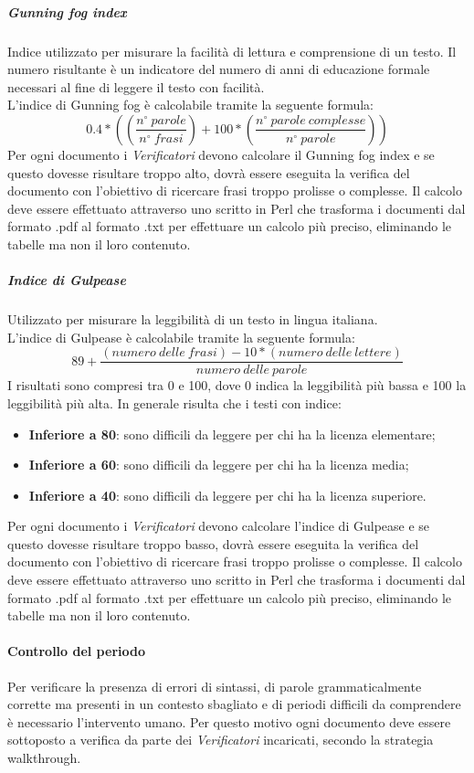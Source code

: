 \subparagraph{Gunning fog index}\Spazio
Indice utilizzato per misurare la facilità di lettura e comprensione di un testo. Il numero risultante è un indicatore del numero di anni di educazione formale necessari al fine di leggere il testo con facilità. \\
L'indice di Gunning fog è calcolabile tramite la seguente formula:
$$
0.4*((\frac{n^{\circ}\:parole}{n^{\circ}\:frasi})+100*(\frac{n^{\circ}\:parole\:complesse}{n^{\circ}\:parole}))
$$
Per ogni documento i \emph{Verificatori} devono calcolare il Gunning fog index e se questo dovesse risultare troppo alto, dovrà essere eseguita la verifica del documento con l'obiettivo di ricercare frasi troppo prolisse o complesse. Il calcolo deve essere effettuato attraverso uno  scritto in Perl che trasforma i documenti dal formato .pdf al formato .txt per effettuare un calcolo più preciso, eliminando le tabelle ma non il loro contenuto.
\subparagraph{Indice di Gulpease}\Spazio
Utilizzato per misurare la leggibilità di un testo in lingua italiana.\\
L'indice di Gulpease è calcolabile tramite la seguente formula:
$$
89+\frac{(numero\:delle\:frasi)-10*(numero\:delle\:lettere)}{numero\:delle\:parole}
$$
I risultati sono compresi tra 0 e 100, dove 0 indica la leggibilità più bassa e 100 la leggibilità più alta. In generale risulta che i testi con indice:
\begin{itemize}
	\item{\textbf{Inferiore	a 80}}: sono difficili da leggere per chi ha la licenza elementare;
	\item{\textbf{Inferiore	a 60}}: sono difficili da leggere per chi ha la licenza media;
	\item{\textbf{Inferiore	a 40}}: sono difficili da leggere per chi ha la licenza superiore.
\end{itemize}
Per ogni documento i \emph{Verificatori} devono calcolare l'indice di Gulpease e se questo dovesse risultare troppo basso, dovrà essere eseguita la verifica del documento con l'obiettivo di ricercare frasi troppo prolisse o complesse. Il calcolo deve essere effettuato attraverso uno  scritto in Perl che trasforma i documenti dal formato .pdf al formato .txt per effettuare un calcolo più preciso, eliminando le tabelle ma non il loro contenuto.
\paragraph{Controllo del periodo} \Spazio
Per verificare la presenza di errori di sintassi, di parole grammaticalmente corrette ma presenti in un contesto sbagliato e di periodi difficili da comprendere è necessario l'intervento umano. Per questo motivo ogni documento deve essere sottoposto a verifica da parte dei \emph{Verificatori} incaricati, secondo la strategia walkthrough.

